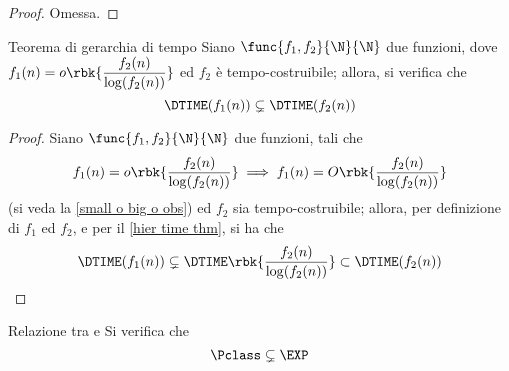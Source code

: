\documentclass[a4paper, 12pt]{report}
\begin{document}
    \begin{proof}
        Omessa.
    \end{proof}

    \begin{framedcor}[label={hier time thm cor}]{Teorema di gerarchia di tempo}
        Siano $\func{f_1, f_2}{\N}{\N}$ due funzioni, dove $f_1(n) = o\rbk{\dfrac{f_2(n)}{\log(f_2(n))}}$ ed $f_2$ è tempo-costruibile; allora, si verifica che $$\DTIME(f_1(n)) \subsetneq \DTIME(f_2(n))$$
    \end{framedcor}

    \begin{proof}
        Siano $\func{f_1, f_2}{\N}{\N}$ due funzioni, tali che $$f_1(n) = o\rbk{\dfrac{f_2(n)}{\log(f_2(n))}} \implies f_1(n) = O\rbk{\dfrac{f_2(n)}{\log(f_2(n))}}$$ (si veda la \cref{small o big o obs}) ed $f_2$ sia tempo-costruibile; allora, per definizione di $f_1$ ed $f_2$, e per il \cref{hier time thm}, si ha che $$\DTIME(f_1(n)) \subsetneq \DTIME\rbk{\dfrac{f_2(n)}{\log(f_2(n))}} \subset \DTIME (f_2(n))$$
    \end{proof}

    \begin{framedprop}[label={p not in exp}]{Relazione tra \Pclass e \EXP}
        Si verifica che $$\Pclass \subsetneq \EXP$$
    \end{framedprop}
\end{document}
